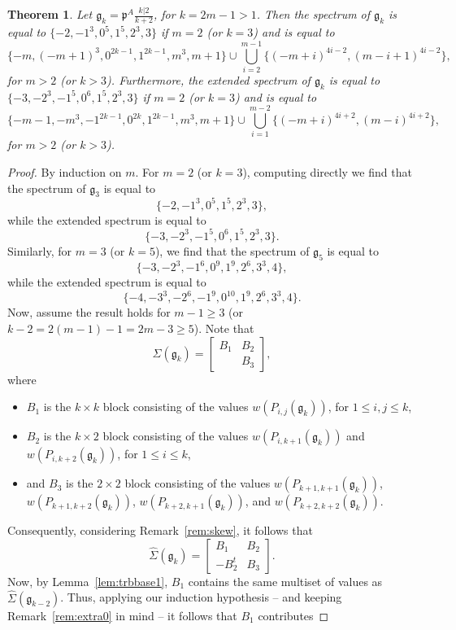 \documentclass[letterpaper,10pt]{article}
\newtheorem{theorem}{Theorem}
\begin{document}
\begin{theorem}\label{thm:k2}
Let $\mathfrak{g}_k=\mathfrak{p}^A\frac{k|2}{k+2}$, for $k=2m-1>1$. Then the spectrum of $\mathfrak{g}_k$ is equal to $\{-2,-1^3,0^5,1^5,2^3,3\}$ if $m=2$ \textup(or $k=3$\textup) and is equal to $$\{-m,(-m+1)^3,0^{2k-1},1^{2k-1},m^3,m+1\}\cup\bigcup_{i=2}^{m-1}\{(-m+i)^{4i-2},(m-i+1)^{4i-2}\},$$ for $m>2$ \textup(or $k>3$\textup). Furthermore, the extended spectrum of $\mathfrak{g}_k$ is equal to $\{-3,-2^3,-1^5,0^6,1^5,2^3,3\}$ if $m=2$ \textup(or $k=3$\textup) and is equal to 
$$\{-m-1,-m^3,-1^{2k-1},0^{2k},1^{2k-1},m^3,m+1\}\cup\bigcup_{i=1}^{m-2}\{(-m+i)^{4i+2},(m-i)^{4i+2}\},$$ for $m>2$ \textup(or $k>3$\textup).
\end{theorem}
\begin{proof}
By induction on $m$. For $m=2$ (or $k=3$), computing directly we find that the spectrum of $\mathfrak{g}_3$ is equal to $$\{-2,-1^3,0^5,1^5,2^3,3\},$$ while the extended spectrum is equal to $$\{-3,-2^3,-1^5,0^6,1^5,2^3,3\}.$$ Similarly, for $m=3$ (or $k=5$), we find that the spectrum of $\mathfrak{g}_5$ is equal to $$\{-3,-2^3,-1^6,0^9,1^9,2^6,3^3,4\},$$ while the extended spectrum is equal to $$\{-4,-3^3,-2^6,-1^9,0^{10},1^9,2^6,3^3,4\}.$$ Now, assume the result holds for $m-1\ge 3$ (or $k-2=2(m-1)-1=2m-3\geq 5$). Note that $$\Sigma(\mathfrak{g}_k)=\begin{bmatrix} B_1 & B_2 \\ & B_3 \end{bmatrix},$$ where
\begin{itemize}
    \item $B_1$ is the $k\times k$ block consisting of the values $w(P_{i,j}(\mathfrak{g}_k))$, for $1\le i,j\le k$,
    \item $B_2$ is the $k\times 2$ block consisting of the values $w(P_{i,k+1}(\mathfrak{g}_k))$ and $w(P_{i,k+2}(\mathfrak{g}_k))$, for $1\le i\le k$,
    \item and $B_3$ is the $2\times 2$ block consisting of the values $w(P_{k+1,k+1}(\mathfrak{g}_k))$, $w(P_{k+1,k+2}(\mathfrak{g}_k))$, $w(P_{k+2,k+1}(\mathfrak{g}_k))$, and $w(P_{k+2,k+2}(\mathfrak{g}_k))$.
\end{itemize}
Consequently, considering Remark~\ref{rem:skew}, it follows that $$\widehat{\Sigma}(\mathfrak{g}_k)=\begin{bmatrix} B_1 & B_2 \\ -B_2^t & B_3 \end{bmatrix}.$$ Now, by Lemma~\ref{lem:trbbase1}, $B_1$ contains the same multiset of values as $\widehat{\Sigma}(\mathfrak{g}_{k-2})$. Thus, applying our induction hypothesis -- and keeping Remark~\ref{rem:extra0} in mind -- it follows that $B_1$ contributes 


\end{proof}
\end{document}
